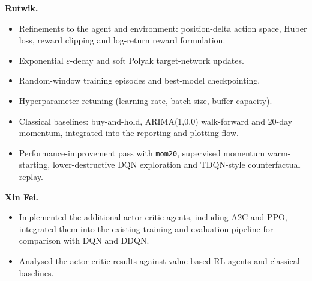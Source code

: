 \documentclass[11pt,twocolumn]{article}
\begin{document}
\vspace{2pt}
\noindent\textbf{Rutwik.}
\begin{itemize}[leftmargin=*, itemsep=1pt, topsep=2pt]
  \item Refinements to the agent and environment: position-delta action space, Huber loss, reward clipping and log-return reward formulation.
  \item Exponential $\varepsilon$-decay and soft Polyak target-network updates.
  \item Random-window training episodes and best-model checkpointing.
  \item Hyperparameter retuning (learning rate, batch size, buffer capacity).
  \item Classical baselines: buy-and-hold, ARIMA(1,0,0) walk-forward and 20-day momentum, integrated into the reporting and plotting flow.
  \item Performance-improvement pass with \texttt{mom20}, supervised momentum warm-starting, lower-destructive DQN exploration and TDQN-style counterfactual replay.
\end{itemize}

\vspace{2pt}
\noindent\textbf{Xin Fei.}
\begin{itemize}[leftmargin=*, itemsep=1pt, topsep=2pt]
  \item Implemented the additional actor-critic agents, including A2C and PPO, integrated them into the existing training and evaluation pipeline for comparison with DQN and DDQN.
  \item Analysed the actor-critic results against value-based RL agents and classical baselines.
\end{itemize}
\end{document}
